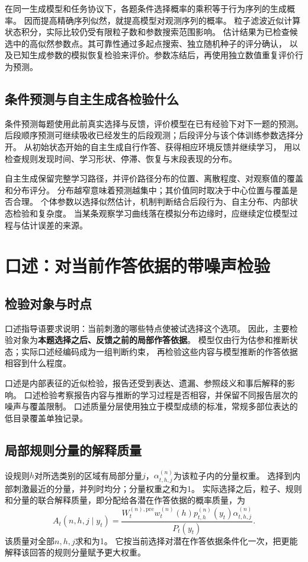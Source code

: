 \documentclass[11pt,a4paper]{article}
\numberwithin{equation}{section}
\begin{document}
在同一生成模型和任务协议下，各题条件选择概率的乘积等于行为序列的生成概率。
因而提高精确序列似然，就提高模型对观测序列的概率。
粒子滤波近似计算状态积分，实际比较仍受有限粒子数和参数搜索范围影响。
估计结果为已检查候选中的高似然参数点。其可靠性通过多起点搜索、独立随机种子的评分确认，
以及已知生成参数的模拟恢复检验来评价。参数冻结后，再使用独立数值重复评价行为预测。

\subsection{条件预测与自主生成各检验什么}
条件预测每题使用此前真实选择与反馈，评价模型在已有经验下对下一题的预测。
后段顺序预测可继续吸收已经发生的后段观测；后段评分与该个体训练参数选择分开。
从初始状态开始的自主生成自行作答、获得相应环境反馈并继续学习，
用以检查规则发现时间、学习形状、停滞、恢复与末段表现的分布。

自主生成保留完整学习路径，并评价路径分布的位置、离散程度、对观察值的覆盖和分布评分。
分布越窄意味着预测越集中；其价值同时取决于中心位置与覆盖是否合理。
个体参数以选择似然估计，机制判断结合后段行为、自主分布、内部状态检验和复杂度。
当某条观察学习曲线落在模拟分布边缘时，应继续定位模型过程与估计误差的来源。

\section{口述：对当前作答依据的带噪声检验}
\label{sec:oral}

\subsection{检验对象与时点}
口述指导语要求说明：当前刺激的哪些特点使被试选择这个选项。
因此，主要检验对象为\textbf{本题选择之后、反馈之前的局部作答依据}。
模型仅由行为估参和推断状态；实际口述经编码成为一组判断约束，
再检验这些内容与模型推断的作答依据相容到什么程度。

口述是内部表征的近似检验，报告还受到表达、遗漏、参照歧义和事后解释的影响。
口述检验考察报告内容与推断的学习过程是否相容，并保留不同报告层次的噪声与覆盖限制。
口述质量分层使用独立于模型成绩的标准，常规多部位表达的低目录覆盖单独记录。

\subsection{局部规则分量的解释质量}
设规则$h$对所选类别的区域有局部分量$j$，$\alpha_{t,h,j}^{(n)}$为该粒子内的分量权重。
选择到内部刺激最近的分量，并列时均分；分量权重之和为1。
实际选择之后，粒子、规则和分量的联合解释质量，即分配给各潜在作答依据的概率质量，为
\begin{equation}
A_t(n,h,j\mid y_t)=
\frac{W_t^{(n),\mathrm{pre}}w_t^{(n)}(h)p_{t,h}^{(n)}(y_t)
\alpha_{t,h,j}^{(n)}}{P_t(y_t)}.
\label{eq:oral-responsibility}
\end{equation}
该质量对全部$n,h,j$求和为1。
它按当前选择对潜在作答依据条件化一次，把更能解释该回答的规则分量赋予更大权重。
\end{document}
